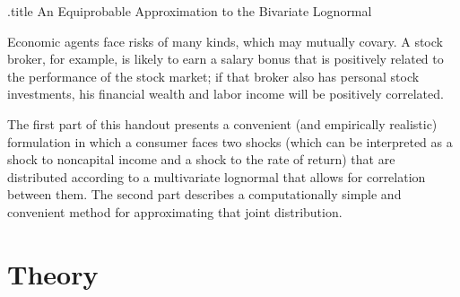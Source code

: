 \documentclass{handout}
\begin{document}
\handoutHeader

\begin{verbatimwrite}{\jobname.title}
An Equiprobable Approximation to the Bivariate Lognormal 
\end{verbatimwrite}

\handoutNameMake

\providecommand{\eVar}{\sigma^{2}_{2}}
\providecommand{\eStd}{\sigma_{2}}

\providecommand{\SolvingMicroDSOPs}{\href{http://www.econ2.jhu.edu/people/ccarroll/SolvingMicroDSOPs/}{SolvingMicroDSOPs}}

Economic agents face risks of many kinds, which may mutually
covary.  A stock broker, for example, is likely to earn a salary
bonus that is positively related to the performance of the stock
market; if that broker also has personal stock investments, his
financial wealth and labor income will be positively correlated.

The first part of this handout presents a convenient (and empirically
realistic) formulation in which a consumer faces two shocks (which can
be interpreted as a shock to noncapital income and a shock to the rate
of return) that are distributed according to a multivariate lognormal
that allows for correlation between them.  The second part describes a
computationally simple and convenient method for approximating that joint
distribution.

\section{Theory}
\end{document}
